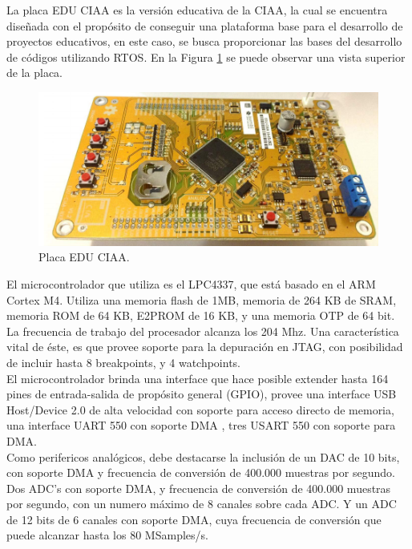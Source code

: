 \documentclass[12pt,letterpaper]{article}
\begin{document}
La placa EDU CIAA es la versión educativa de la CIAA, la cual se encuentra diseñada con el propósito de conseguir una plataforma base para el desarrollo de proyectos educativos, en este caso, se busca proporcionar las bases del desarrollo de códigos utilizando RTOS. En la Figura \ref{Fig_placa} se puede observar una vista superior de la placa.

\begin{figure}[H]
\centering
\includegraphics[width=10 cm]{figuras/descripcion1.png}
\caption{Placa EDU CIAA.}
\label{Fig_placa}
\end{figure}

El microcontrolador que utiliza es el LPC4337, que está basado en el ARM Cortex M4. Utiliza una memoria flash de 1MB, memoria de 264 KB de SRAM, memoria ROM de 64 KB, E2PROM de 16 KB, y una memoria OTP de 64 bit.
  \\

La frecuencia de trabajo del procesador alcanza los 204 Mhz. Una característica vital de éste, es que provee soporte para la depuración en JTAG, con posibilidad de incluir hasta 8 breakpoints, y 4 watchpoints.
  \\

El microcontrolador brinda una interface que hace posible extender hasta 164 pines de entrada-salida de propósito general (GPIO), provee una interface USB Host/Device 2.0 de alta velocidad con soporte para acceso directo de memoria, una interface UART 550 con soporte DMA , tres USART 550 con soporte para DMA.
  \\

Como perifericos analógicos, debe destacarse la inclusión de un DAC de 10 bits, con soporte DMA y frecuencia de conversión de 400.000 muestras por segundo. Dos ADC's con soporte DMA, y frecuencia de conversión de 400.000 muestras por segundo, con un numero máximo de 8 canales sobre cada ADC. Y un ADC de 12 bits de 6 canales con soporte DMA, cuya frecuencia de conversión que puede alcanzar hasta los 80 MSamples/s.
  \\
\end{document}
